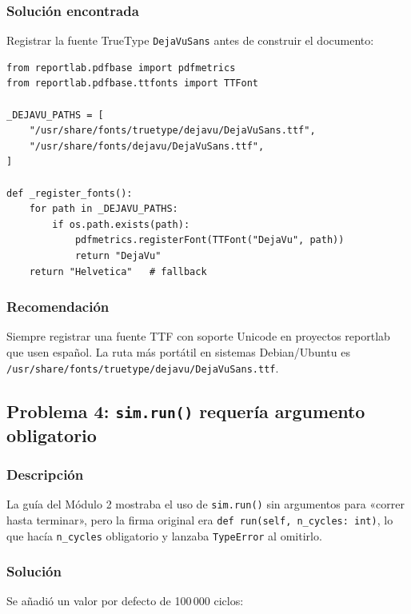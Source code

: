 \documentclass[12pt,letterpaper]{article}
\begin{document}
\subsubsection*{Solución encontrada}

Registrar la fuente TrueType \texttt{DejaVuSans} antes de construir el documento:

\begin{lstlisting}
from reportlab.pdfbase import pdfmetrics
from reportlab.pdfbase.ttfonts import TTFont

_DEJAVU_PATHS = [
    "/usr/share/fonts/truetype/dejavu/DejaVuSans.ttf",
    "/usr/share/fonts/dejavu/DejaVuSans.ttf",
]

def _register_fonts():
    for path in _DEJAVU_PATHS:
        if os.path.exists(path):
            pdfmetrics.registerFont(TTFont("DejaVu", path))
            return "DejaVu"
    return "Helvetica"   # fallback
\end{lstlisting}

\subsubsection*{Recomendación}

Siempre registrar una fuente TTF con soporte Unicode en proyectos reportlab que usen
español. La ruta más portátil en sistemas Debian/Ubuntu es
\texttt{/usr/share/fonts/truetype/dejavu/DejaVuSans.ttf}.

\vspace{0.8em}
\subsection{Problema 4: \texttt{sim.run()} requería argumento obligatorio}

\subsubsection*{Descripción}

La guía del Módulo 2 mostraba el uso de \texttt{sim.run()} sin argumentos para
«correr hasta terminar», pero la firma original era \texttt{def run(self, n\_cycles: int)},
lo que hacía \texttt{n\_cycles} obligatorio y lanzaba \texttt{TypeError} al omitirlo.

\subsubsection*{Solución}

Se añadió un valor por defecto de 100\,000 ciclos:
\end{document}
